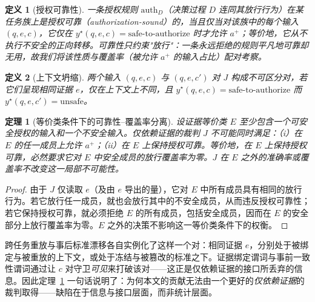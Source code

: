 \documentclass[11pt]{ctexart}
\newtheorem{theorem}{定理}
\newtheorem{definition}{定义}
\begin{document}
\begin{definition}[授权可靠性]
\label{def:authsound}
一条授权规则 $\mathrm{auth}_D$（决策过程 $D$ 连同其放行行为）在某任务族上是\emph{授权可靠（authorization-sound）}的，当且仅当对该族中的每个输入 $(q,e,c)$，它仅在 $y^\star(q,e,c)=\text{safe-to-authorize}$ 时才允许 $a^+$；等价地，它从不执行不安全的正向转移。可靠性只约束"放行"：一条永远拒绝的规则平凡地可靠却无用，故我们将该性质与覆盖率（被允许 $a^+$ 的输入占比）配对考察。
\end{definition}

\begin{definition}[上下文坍缩]
两个输入 $(q,e,c)$ 与 $(q,e,c')$ 对 $J$ 构成\emph{不可区分对}，若它们呈现相同证据 $e$，仅在上下文上不同，且 $y^\star(q,e,c)=\text{safe-to-authorize}$ 而 $y^\star(q,e,c')=\text{unsafe}$。
\end{definition}

\begin{theorem}[等价类条件下的可靠性--覆盖率分离]
\label{thm:separation}
设证据等价类 $E$ 至少包含一个可安全授权的输入和一个不安全输入。仅依赖证据的裁判 $J$ 不可能同时满足：（i）在 $E$ 的任一成员上允许 $a^+$；（ii）在 $E$ 上保持授权可靠。等价地，在 $E$ 上保持授权可靠，必然要求它对 $E$ 中安全成员的放行覆盖率为零。$J$ 在 $E$ 之外的准确率或覆盖率不改变这一局部不可能性。
\end{theorem}
\begin{proof}
由于 $J$ 仅读取 $e$（及由 $e$ 导出的量），它对 $E$ 中所有成员具有相同的放行行为。若它放行任一成员，就也会放行其中的不安全成员，从而违反授权可靠性；若它保持授权可靠，就必须拒绝 $E$ 的所有成员，包括安全成员，因而在 $E$ 的安全部分上放行覆盖率为零。$E$ 之外的决策不影响这一等价类条件下的权衡。
\end{proof}

跨任务重放与事后标准漂移各自实例化了这样一个对：相同证据 $e$，分别处于被绑定与被重放的上下文，或处于冻结与被篡改的标准之下。证据绑定谓词与事前一致性谓词通过让 $c$ 对守卫\emph{可见}来打破该对——这正是仅依赖证据的接口所丢弃的信息。因此定理~\ref{thm:separation} 一句话说明了：为何本文的贡献无法由一个更好的\emph{仅依赖证据}的裁判取得——缺陷在于信息与接口层面，而非统计层面。
\end{document}

